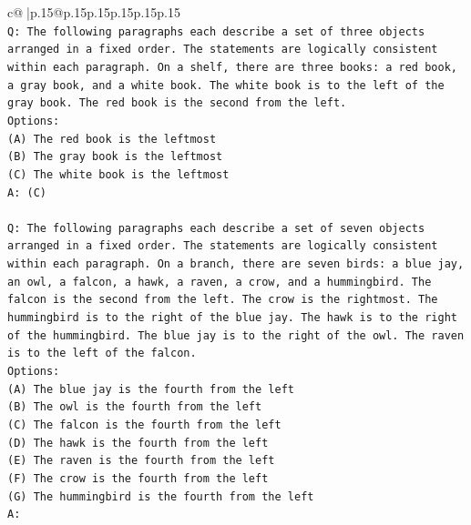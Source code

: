 \documentclass{article}
\begin{document}
{\begin{supertabular}{c@{$\;$}|p{.15\linewidth}@{}p{.15\linewidth}p{.15\linewidth}p{.15\linewidth}p{.15\linewidth}p{.15\linewidth}}
{{{\\ 
\texttt{Q: The following paragraphs each describe a set of three objects arranged in a fixed order. The statements are logically consistent within each paragraph. On a shelf, there are three books: a red book, a gray book, and a white book. The white book is to the left of the gray book. The red book is the second from the left.} \\
\texttt{Options:} \\
\texttt{(A) The red book is the leftmost} \\
\texttt{(B) The gray book is the leftmost} \\
\texttt{(C) The white book is the leftmost} \\
\texttt{A: (C)} \\
\\ 
\texttt{Q: The following paragraphs each describe a set of seven objects arranged in a fixed order. The statements are logically consistent within each paragraph. On a branch, there are seven birds: a blue jay, an owl, a falcon, a hawk, a raven, a crow, and a hummingbird. The falcon is the second from the left. The crow is the rightmost. The hummingbird is to the right of the blue jay. The hawk is to the right of the hummingbird. The blue jay is to the right of the owl. The raven is to the left of the falcon.} \\
\texttt{Options:} \\
\texttt{(A) The blue jay is the fourth from the left} \\
\texttt{(B) The owl is the fourth from the left} \\
\texttt{(C) The falcon is the fourth from the left} \\
\texttt{(D) The hawk is the fourth from the left} \\
\texttt{(E) The raven is the fourth from the left} \\
\texttt{(F) The crow is the fourth from the left} \\
\texttt{(G) The hummingbird is the fourth from the left} \\
\texttt{A:} \\
            }
        }
    }
     \\ \\


\end{supertabular}}
\end{document}
